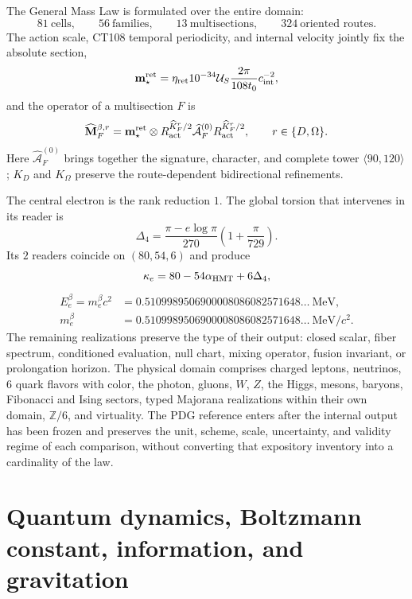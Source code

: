 The General Mass Law is formulated over the entire domain:
\[
 81\ \text{cells},\qquad56\ \text{families},\qquad
 13\ \text{multisections},\qquad324\ \text{oriented routes}.
\]
The action scale, CT108 temporal periodicity, and internal velocity
jointly fix the absolute section,
\[
 \mathbf m_\star^{\rm ret}
 =\eta_{\rm ret}10^{-34}\mathcal U_S
   \frac{2\pi}{108t_0}c_{\rm int}^{-2},
\]
and the operator of a multisection \(F\) is
\[
 \widehat{\mathbf M}^{\beta,r}_F
 =\mathbf m_\star^{\rm ret}\otimes
  R_{\rm act}^{\widehat K_F^r/2}
  \widehat{\mathcal A}^{(0)}_F
  R_{\rm act}^{\widehat K_F^r/2},
 \qquad r\in\{D,\Omega\}.
\]
Here \(\widehat{\mathcal A}^{(0)}_F\) brings together the signature, character, and complete
tower \(\langle90,120\rangle\); \(K_D\) and \(K_\Omega\) preserve the
route-dependent bidirectional refinements.

The central electron is the rank reduction \(1\). The global torsion that
intervenes in its reader is
\[
 \Delta_4=\frac{\pi-e\log\pi}{270}
 \left(1+\frac{\pi}{729}\right).
\]
Its \(2\) readers coincide
on \((80,54,6)\) and produce
\[
 \kappa_e=80-54\alpha_{\rm HMT}+6\Delta_4,
\]
\[
 \boxed{\begin{aligned}
 E_e^\beta=m_e^\beta c^2
 &=0.5109989506900008086082571648\ldots\ \mathrm{MeV},\\
 m_e^\beta
 &=0.5109989506900008086082571648\ldots\ \mathrm{MeV}/c^2.
 \end{aligned}}
\]
The remaining realizations preserve the type of their output: closed scalar,
fiber spectrum, conditioned evaluation, null chart, mixing operator,
fusion invariant, or prolongation horizon. The physical domain comprises
charged leptons, neutrinos, \(6\) quark flavors with color, the photon,
gluons, \(W\), \(Z\), the Higgs, mesons, baryons, Fibonacci and
Ising sectors, typed Majorana realizations within their own domain,
\(\mathbb Z/6\), and virtuality. The PDG reference enters
after the internal output has been frozen and preserves the unit, scheme, scale,
uncertainty, and validity regime of each comparison, without converting that
expository inventory into a cardinality of the law.

\section*{Quantum dynamics, Boltzmann constant, information, and gravitation}

